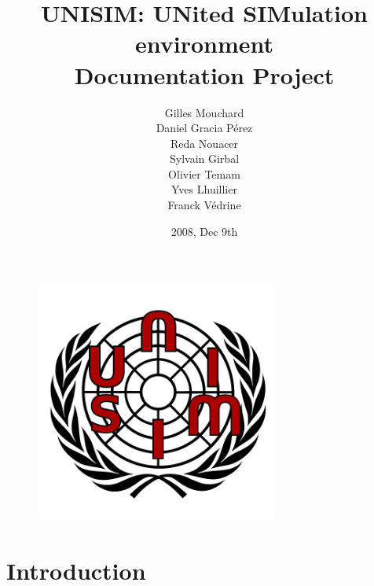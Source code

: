 \documentclass[a4paper,11pt,onecolumn]{mathese}
\begin{document}
\setlength{\parskip}{0.5em}%
\baselineskip 14pt


\title{\bf \huge UNISIM: UNited SIMulation environment\\Documentation Project}
\author{Gilles Mouchard \\Daniel Gracia P\'erez\\Reda Nouacer\\Sylvain Girbal\\Olivier Temam\\Yves Lhuillier \\Franck V\'edrine}
\date{2008, Dec 9th}

\begin{titlepage}
\begin{figure}
\begin{center}
\includegraphics[width=8cm]{logo_unisim.pdf}
\maketitle
\end{center}
\end{figure}
\end{titlepage}
%
%


\tableofcontents {}
\listoffigures

\mainmatter

\chapter{Introduction}
\label{introduction}

\end{document}
